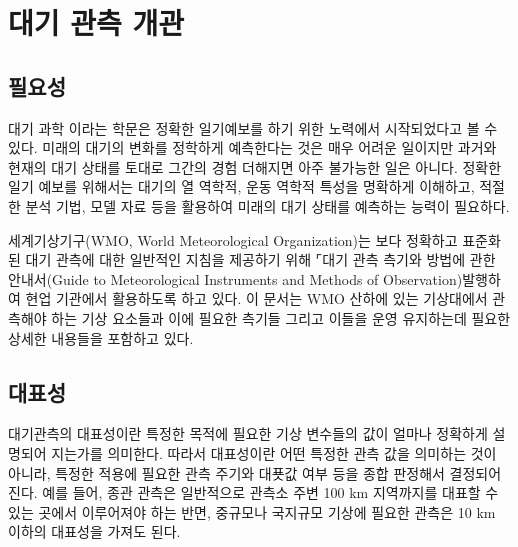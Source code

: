 


\section{대기 관측 개관}

\subsection{필요성}

대기 과학 이라는 학문은 정확한 일기예보를 하기 위한 노력에서 시작되었다고 볼 수 있다. 미래의 대기의 변화를 정학하게 예측한다는 것은 매우 어려운 일이지만 과거와 현재의 대기 상태를 토대로 그간의 경험 더해지면 아주 불가능한 일은 아니다. 정확한 일기 예보를 위해서는 대기의 열 역학적, 운동 역학적 특성을 명확하게 이해하고, 적절한 분석 기법, 모델 자료 등을 활용하여 미래의 대기 상태를 예측하는 능력이 필요하다. 

세계기상기구(WMO, World Meteorological Organization)는 보다 정확하고 표준화된 대기 관측에 대한 일반적인 지침을 제공하기 위해 ⌜대기 관측 측기와 방법에 관한 안내서(Guide to Meteorological Instruments and Methods of Observation)\을 발행하여 현업 기관에서 활용하도록 하고 있다. 이 문서는 WMO 산하에 있는 기상대에서 관측해야 하는 기상 요소들과 이에 필요한 측기들 그리고 이들을 운영 유지하는데 필요한 상세한 내용들을 포함하고 있다. 

\subsection{대표성}

대기관측의 대표성이란 특정한 목적에 필요한 기상 변수들의 값이 얼마나 정확하게 설명되어 지는가를 의미한다. 따라서 대표성이란 어떤 특정한 관측 값을 의미하는 것이 아니라, 특정한 적용에 필요한 관측 주기와 대푯값 여부 등을 종합 판정해서 결정되어진다. 예를 들어, 종관 관측은 일반적으로 관측소 주변 100 km 지역까지를 대표할 수 있는 곳에서 이루어져야 하는 반면, 중규모나 국지규모 기상에 필요한 관측은 10 km 이하의 대표성을 가져도 된다.

